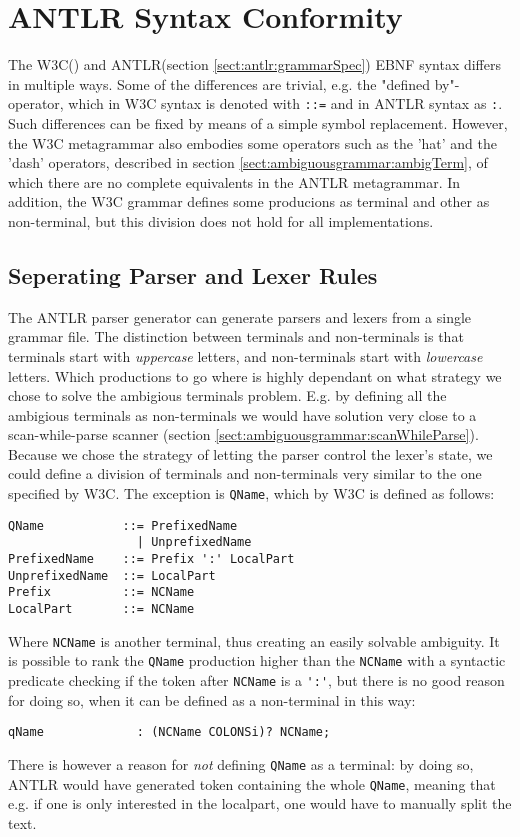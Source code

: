 \section{ANTLR Syntax Conformity}
The W3C(\cite{w3c00}) and ANTLR(section \ref{sect:antlr:grammarSpec}) EBNF syntax differs in multiple ways. Some of the differences are trivial, e.g. the "defined by"-operator, which in W3C syntax is denoted with \verb!::=! and in ANTLR syntax as \verb!:!. Such differences can be fixed by means of a simple symbol replacement. However, the W3C metagrammar also embodies some operators such as the 'hat' and the 'dash' operators, described in section \ref{sect:ambiguousgrammar:ambigTerm}, of which there are no complete equivalents in the ANTLR metagrammar. In addition, the W3C grammar defines some producions as terminal and other as non-terminal, but this division does not hold for all implementations.

\subsection{Seperating Parser and Lexer Rules}

The ANTLR parser generator can generate parsers and lexers from a single grammar file. The distinction between terminals and non-terminals is that terminals start with \emph{uppercase} letters, and non-terminals start with \emph{lowercase} letters. Which productions to go where is highly dependant on what strategy we chose to solve the ambigious terminals problem. E.g. by defining all the ambigious terminals as non-terminals we would have solution very close to a scan-while-parse scanner (section \ref{sect:ambiguousgrammar:scanWhileParse}). Because we chose the strategy of letting the parser control the lexer's state, we could define a division of terminals and non-terminals very similar to the one specified by W3C. The exception is \verb!QName!, which by W3C is defined as follows:
\begin{verbatim}
QName           ::= PrefixedName
                  | UnprefixedName
PrefixedName    ::= Prefix ':' LocalPart 
UnprefixedName  ::= LocalPart 
Prefix          ::= NCName
LocalPart       ::= NCName
\end{verbatim}
Where \verb!NCName! is another terminal, thus creating an easily solvable ambiguity. It is possible to rank the \verb!QName! production higher than the \verb!NCName! with a syntactic predicate checking if the token after \verb!NCName! is a \verb!':'!, but there is no good reason for doing so, when it can be defined as a non-terminal in this way:
\begin{verbatim}
qName             : (NCName COLONSi)? NCName;
\end{verbatim}
There is however a reason for \emph{not} defining \verb!QName! as a terminal: by doing so, ANTLR would have generated token containing the whole \verb!QName!, meaning that e.g. if one is only interested in the localpart, one would have to manually split the text.

